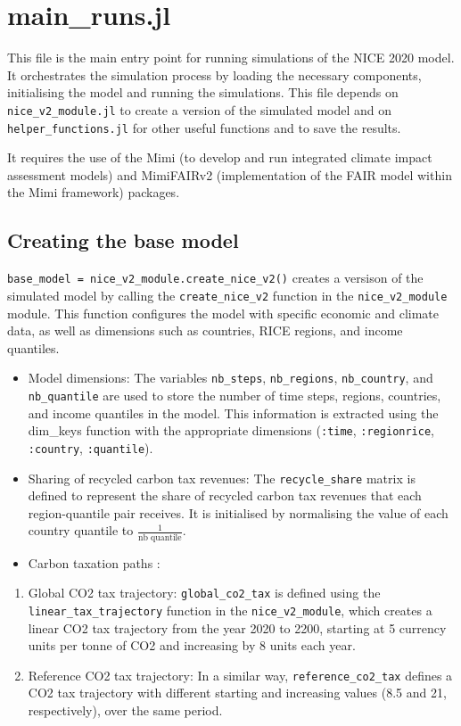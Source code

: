 \documentclass[
]{article}
\begin{document}
\section{main\_runs.jl}\label{main_runs.jl}

This file is the main entry point for running simulations of the NICE
2020 model. It orchestrates the simulation process by loading the
necessary components, initialising the model and running the
simulations. This file depends on \texttt{nice\_v2\_module.jl} to create
a version of the simulated model and on \texttt{helper\_functions.jl}
for other useful functions and to save the results.

It requires the use of the Mimi (to develop and run integrated climate
impact assessment models) and MimiFAIRv2 (implementation of the FAIR
model within the Mimi framework) packages.

\subsection{Creating the base model}\label{creating-the-base-model}

\texttt{base\_model\ =\ nice\_v2\_module.create\_nice\_v2()} creates a
versison of the simulated model by calling the \texttt{create\_nice\_v2}
function in the \texttt{nice\_v2\_module} module. This function
configures the model with specific economic and climate data, as well as
dimensions such as countries, RICE regions, and income quantiles.

\begin{itemize}
\item
  Model dimensions: The variables \texttt{nb\_steps},
  \texttt{nb\_regions}, \texttt{nb\_country}, and \texttt{nb\_quantile}
  are used to store the number of time steps, regions, countries, and
  income quantiles in the model. This information is extracted using the
  dim\_keys function with the appropriate dimensions (\texttt{:time},
  \texttt{:regionrice}, \texttt{:country}, \texttt{:quantile}).
\item
  Sharing of recycled carbon tax revenues: The \texttt{recycle\_share}
  matrix is defined to represent the share of recycled carbon tax
  revenues that each region-quantile pair receives. It is initialised by
  normalising the value of each country quantile to
  \(\frac{1}{\text{nb quantile}}\).
\item
  Carbon taxation paths :
\end{itemize}

\begin{enumerate}
\def\labelenumi{\arabic{enumi}.}
\item
  Global CO2 tax trajectory: \texttt{global\_co2\_tax} is defined using
  the \texttt{linear\_tax\_trajectory} function in the
  \texttt{nice\_v2\_module}, which creates a linear CO2 tax trajectory
  from the year 2020 to 2200, starting at 5 currency units per tonne of
  CO2 and increasing by 8 units each year.
\item
  Reference CO2 tax trajectory: In a similar way,
  \texttt{reference\_co2\_tax} defines a CO2 tax trajectory with
  different starting and increasing values (8.5 and 21, respectively),
  over the same period.
\end{enumerate}
\end{document}
